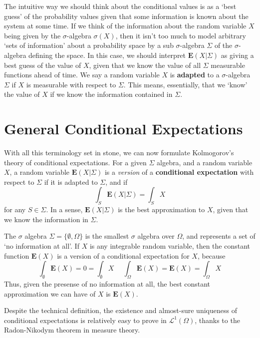 The intuitive way we should think about the conditional values is as a `best guess' of the probability values given that some information is known about the system at some time. If we think of the information about the random variable $X$ being given by the $\sigma$-algebra $\sigma(X)$, then it isn't too much to model arbitrary `sets of information' about a probability space by a sub $\sigma$-algebra $\Sigma$ of the $\sigma$-algebra defining the space. In this case, we should interpret $\mathbf{E}(X|\Sigma)$ as giving a best guess of the value of $X$, given that we know the value of all $\Sigma$ measurable functions ahead of time. We say a random variable $X$ is {\bf adapted} to a $\sigma$-algebra $\Sigma$ if $X$ is measurable with respect to $\Sigma$. This means, essentially, that we `know' the value of $X$ if we know the information contained in $\Sigma$.

\section{General Conditional Expectations}

With all this terminology set in stone, we can now formulate Kolmogorov's theory of conditional expectations. For a given $\Sigma$ algebra, and a random variable $X$, a random variable $\mathbf{E}(X|\Sigma)$ is a {\it version} of a {\bf conditional expectation} with respect to $\Sigma$ if it is adapted to $\Sigma$, and if
%
\[ \int_S \mathbf{E}(X|\Sigma) = \int_S X \]
%
for any $S \in \Sigma$. In a sense, $\mathbf{E}(X|\Sigma)$ is the best approximation to $X$, given that we know the information in $\Sigma$.

\begin{example}
    The $\sigma$ algebra $\Sigma = \{ \emptyset, \Omega \}$ is the smallest $\sigma$ algebra over $\Omega$, and represents a set of `no information at all'. If $X$ is any integrable random variable, then the constant function $\mathbf{E}(X)$ is a version of a conditional expectation for $X$, because
    \[ \int_\emptyset \mathbf{E}(X) = 0 = \int_\emptyset X\ \ \ \ \ \ \int_\Omega \mathbf{E}(X) = \mathbf{E}(X) = \int_\Omega X \]
    Thus, given the presense of no information at all, the best constant approximation we can have of $X$ is $\mathbf{E}(X)$.
\end{example}

Despite the technical definition, the existence and almost-sure uniqueness of conditional expectations is relatively easy to prove in $\mathcal{L}^1(\Omega)$, thanks to the Radon-Nikodym theorem in measure theory.

